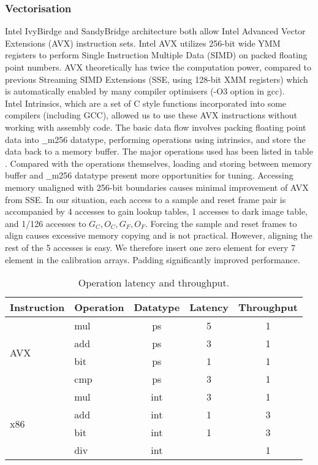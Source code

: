 \documentclass[journal]{IEEEtran}
\begin{document}
\subsubsection{Vectorisation}
Intel IvyBirdge and SandyBridge architecture both allow Intel Advanced Vector Extensions (AVX) instruction sets. Intel AVX utilizes 256-bit wide YMM registers to perform Single Instruction Multiple Data (SIMD) on packed floating point numbers. AVX theoretically has twice the computation power, compared to previous Streaming SIMD Extensions (SSE, using 128-bit XMM registers) which is automatically enabled by many compiler optimisers (-O3 option in gcc). \\
Intel Intrinsics, which are a set of C style functions incorporated into some compilers (including GCC), allowed us to use these AVX instructions without working with assembly code. The basic data flow involves packing floating point data into $\_\_$m256 datatype, performing operations using intrinsics, and store the data back to a memory buffer. The major operations used has been listed in table . Compared with the operations themselves, loading and storing between memory buffer and $\_\_$m256 datatype present more opportunities for tuning. Accessing memory unaligned with 256-bit boundaries causes minimal improvement of AVX from SSE. In our situation, each access to a sample and reset frame pair is accompanied by 4 accesses to gain lookup tables, 1 accesses to dark image table, and 1/126 accesses to $G_C, O_C, G_F, O_F$. Forcing the sample and reset frames to align causes excessive memory copying and is not practical. However, aligning the rest of the 5 accesses is easy. We therefore insert one zero element for every 7 element in the calibration arrays. Padding significantly improved performance. 

\begin{table}[h]
\centering
\label{ops}
\begin{tabular}{l l c c c}
\hline
Instruction & Operation & Datatype & Latency & Throughput \\
\hline \hline
\multirow{4}{*}{AVX}
 & mul & ps 	& 5 	& 1 \\
 & add & ps 	& 3 	& 1 \\
 & bit & ps 	& 1 	& 1 \\
 & cmp & ps 	& 3 	& 1 \\
\hline

\multirow{4}{*}{x86}
 & mul & int 	& 3 	& 1 \\
 & add & int	& 1 	& 3 \\
 & bit & int 	& 1 	& 3 \\
 & div & int 	& \texttildelow 21 	& 1 \\
\hline

\end{tabular}
\caption{Operation latency and throughput.}
\end{table}
\end{document}
